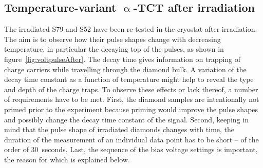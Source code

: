 \subsection{Temperature-variant $\upalpha$-TCT after irradiation}
The irradiated S79 and S52 have been re-tested in the cryostat after irradiation. The aim is to observe how their pulse shapes change with decreasing temperature, in particular the decaying top of the pulses, as shown in figure~\ref{fig:voltpulseAfter}. The decay time gives information on trapping of charge carriers while travelling through the diamond bulk. A variation of the decay time constant as a function of temperature might help to reveal the type and depth of the charge traps. To observe these effects or lack thereof, a number of requirements have to be met. First, the diamond samples are intentionally not primed prior to the experiment because priming would improve the pulse shapes and possibly change the decay time constant of the signal. Second, keeping in mind that the pulse shape of irradiated diamonds changes with time, the duration of the measurement of an individual data point has to be short -- of the order of 30~seconds. Last, the sequence of the bias voltage settings is important, the reason for which is explained below.

